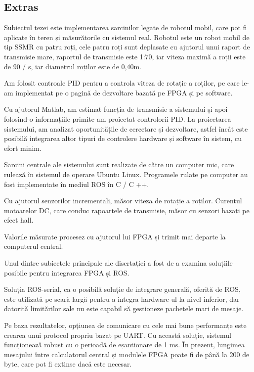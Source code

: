 \begin{titlepage}


\section*{Extras}
Subiectul tezei este implementarea sarcinilor legate de robotul mobil, care pot fi aplicate în teren și măsurătorile cu sistemul real. Robotul este un robot mobil de tip SSMR cu patru roți, cele patru roți sunt deplasate cu ajutorul unui raport de transmisie mare, raportul de transmisie este 1:70, iar viteza maximă a roții este de 90 \degree / s, iar diametrul roților este de 0,40m.

Am folosit controale PID pentru a controla viteza de rotație a roților, pe care le-am implementat pe o pagină de dezvoltare bazată pe FPGA și pe software.

Cu ajutorul Matlab, am estimat funcția de transmisie a sistemului și apoi folosind-o informațiile primite am proiectat controlorii PID. La proiectarea sistemului, am analizat oportunitățile de cercetare și dezvoltare, astfel încât este posibilă integrarea altor tipuri de controlere hardware și software în sistem, cu efort minim.

Sarcini centrale ale sistemului sunt realizate de către un computer mic, care rulează în sistemul de operare Ubuntu Linux. Programele rulate pe computer au fost implementate în mediul ROS în C / C ++.

Cu ajutorul senzorilor incrementali, măsor viteza de rotație a roților. Curentul motoarelor DC, care  conduc rapoartele de transmisie, măsor cu senzori bazați pe efect hall.

Valorile măsurate procesez cu ajutorul lui FPGA și trimit mai departe la computerul central.

Unul dintre subiectele principale ale disertației a fost de a examina soluțiile posibile pentru integrarea FPGA și ROS.

Soluția ROS-serial, ca o posibilă soluție de integrare generală, oferită de ROS, este utilizată pe scară largă pentru a integra hardware-ul la nivel inferior, dar datorită limitărilor sale nu este capabil să gestioneze pachetele mari de mesaje.

Pe baza rezultatelor, opțiunea de comunicare cu cele mai bune performanțe este crearea unui protocol propriu bazat pe UART. Cu această soluție, sistemul funcționează robust cu o perioadă de eșantionare de 1 ms. În prezent, lungimea mesajului între calculatorul central și modulele FPGA poate fi de până la 200 de byte, care pot fi extinse dacă este necesar.


\end{titlepage}

